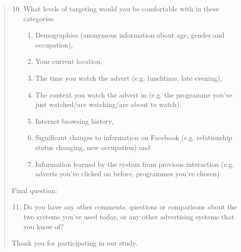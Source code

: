 \begin{quotation}
	\begin{enumerate}
	  	\setcounter{enumi}{9}
		\item What levels of targeting would you be comfortable with in these categories:
		\begin{enumerate}[label=\alph*]
			\item Demographics (anonymous information about age, gender and occupation),
			\item Your current location,
			\item The time you watch the advert (e.g. lunchtime, late evening),
			\item The context you watch the advert in (e.g. the programme you’ve just watched/are watching/are about to watch),
			\item Internet browsing history,
			\item Significant changes to information on Facebook (e.g. relationship status changing, new occupation)
			and
			\item Information learned by the system from previous interaction (e.g. adverts you've clicked on before, programmes you've chosen)\\
		\end{enumerate}
	\end{enumerate}

	\noindent Final question:\\

	\begin{enumerate}
	  	\setcounter{enumi}{10}
		\item Do you have any other comments, questions or comparisons about the two systems you've used today, or any other advertising systems that you know of?\\
	\end{enumerate}

	\noindent Thank you for participating in our study.
\end{quotation}